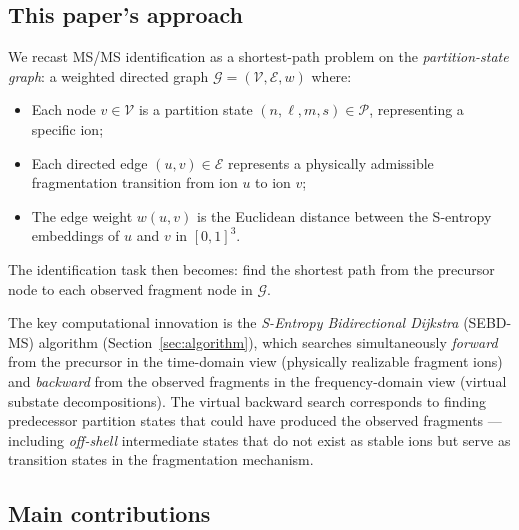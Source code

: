 \documentclass[twocolumn,10pt,a4paper]{article}
\theoremstyle{thmstyle}
\theoremstyle{definition}
\theoremstyle{remark}
\newcommand{\Parts}{\mathcal{P}}
\newcommand{\calG}{\mathcal{G}}
\newcommand{\calV}{\mathcal{V}}
\newcommand{\calE}{\mathcal{E}}
\begin{document}
\subsection{This paper's approach}

We recast MS/MS identification as a shortest-path problem on the
\emph{partition-state graph}: a weighted directed graph $\calG =
(\calV, \calE, w)$ where:
\begin{itemize}[nosep]
\item Each node $v \in \calV$ is a partition state
  $(n, \ell, m, s) \in \Parts$, representing a specific ion;
\item Each directed edge $(u, v) \in \calE$ represents a physically
  admissible fragmentation transition from ion $u$ to ion $v$;
\item The edge weight $w(u, v)$ is the Euclidean distance between the
  S-entropy embeddings of $u$ and $v$ in $[0,1]^3$.
\end{itemize}

The identification task then becomes: find the shortest path from the
precursor node to each observed fragment node in $\calG$.

The key computational innovation is the \emph{S-Entropy Bidirectional
Dijkstra} (SEBD-MS) algorithm (Section~\ref{sec:algorithm}), which searches
simultaneously \emph{forward} from the precursor in the time-domain view
(physically realizable fragment ions) and \emph{backward} from the observed
fragments in the frequency-domain view (virtual substate decompositions).
The virtual backward search corresponds to finding predecessor partition
states that could have produced the observed fragments --- including
\emph{off-shell} intermediate states that do not exist as stable ions but
serve as transition states in the fragmentation mechanism.

\subsection{Main contributions}
\end{document}
